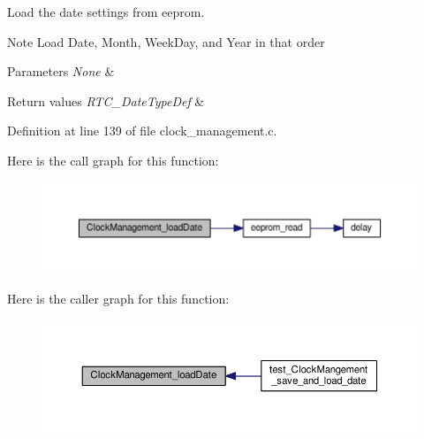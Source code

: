 Load the date settings from eeprom. 

\begin{DoxyNote}{Note}
Load Date, Month, Week\+Day, and Year in that order 
\end{DoxyNote}

\begin{DoxyParams}{Parameters}
{\em None} & \\
\hline
\end{DoxyParams}

\begin{DoxyRetVals}{Return values}
{\em R\+T\+C\+\_\+\+Date\+Type\+Def} & \\
\hline
\end{DoxyRetVals}


Definition at line 139 of file clock\+\_\+management.\+c.



Here is the call graph for this function\+:\nopagebreak
\begin{figure}[H]
\begin{center}
\leavevmode
\includegraphics[width=350pt]{df/d13/group___clock___management___eeprom_ga3980560a99803ef94287127ff3157f91_cgraph}
\end{center}
\end{figure}




Here is the caller graph for this function\+:\nopagebreak
\begin{figure}[H]
\begin{center}
\leavevmode
\includegraphics[width=350pt]{df/d13/group___clock___management___eeprom_ga3980560a99803ef94287127ff3157f91_icgraph}
\end{center}
\end{figure}


